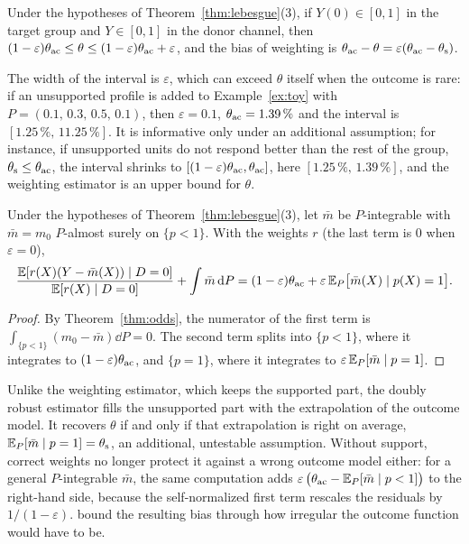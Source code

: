\begin{corollary}\label{cor:bounds}
Under the hypotheses of Theorem~\ref{thm:lebesgue}(3), if $Y(0)\in[0,1]$ in the target group and $Y\in[0,1]$ in the donor channel, then $(1-\varepsilon)\theta_{\mathrm{ac}}\le\theta\le(1-\varepsilon)\theta_{\mathrm{ac}}+\varepsilon$, and the bias of weighting is $\theta_{\mathrm{ac}}-\theta=\varepsilon(\theta_{\mathrm{ac}}-\theta_{\mathrm{s}})$.
\end{corollary}
The width of the interval is $\varepsilon$, which can exceed $\theta$ itself when the outcome is rare: if an unsupported profile is added to Example~\ref{ex:toy} with $P=(0.1,\,0.3,\,0.5,\,0.1)$, then $\varepsilon=0.1$, $\theta_{\mathrm{ac}}=1.39\,\%$ and the interval is $[1.25\,\%,\,11.25\,\%]$. It is informative only under an additional assumption; for instance, if unsupported units do not respond better than the rest of the group, $\theta_{\mathrm{s}}\le\theta_{\mathrm{ac}}$, the interval shrinks to $[(1-\varepsilon)\theta_{\mathrm{ac}},\theta_{\mathrm{ac}}]$, here $[1.25\,\%,\,1.39\,\%]$, and the weighting estimator is an upper bound for $\theta$.

\begin{corollary}\label{cor:drnosupport}
Under the hypotheses of Theorem~\ref{thm:lebesgue}(3), let $\bar m$ be $P$-integrable with $\bar m=m_0$ $P$-almost surely on $\{p<1\}$. With the weights $r$ (the last term is $0$ when $\varepsilon=0$),
\[
\frac{\mathbb{E}[r(X)(Y-\bar m(X))\mid D=0]}{\mathbb{E}[r(X)\mid D=0]}+\int\bar m\,\mathrm{d} P=(1-\varepsilon)\theta_{\mathrm{ac}}+\varepsilon\,\mathbb{E}_P\bigl[\bar m(X)\mid p(X)=1\bigr].
\]
\end{corollary}
\begin{proof}
By Theorem~\ref{thm:odds}, the numerator of the first term is $\int_{\{p<1\}}(m_0-\bar m)\dd P=0$. The second term splits into $\{p<1\}$, where it integrates to $(1-\varepsilon)\theta_{\mathrm{ac}}$, and $\{p=1\}$, where it integrates to $\varepsilon\,\mathbb{E}_P[\bar m\mid p=1]$.
\end{proof}

Unlike the weighting estimator, which keeps the supported part, the doubly robust estimator fills the unsupported part with the extrapolation of the outcome model. It recovers $\theta$ if and only if that extrapolation is right on average, $\mathbb{E}_P[\bar m\mid p=1]=\theta_{\mathrm{s}}$, an additional, untestable assumption. Without support, correct weights no longer protect it against a wrong outcome model either: for a general $P$-integrable $\bar m$, the same computation adds $\varepsilon\,\bigl(\theta_{\mathrm{ac}}-\mathbb{E}_P[\bar m\mid p<1]\bigr)$ to the right-hand side, because the self-normalized first term rescales the residuals by $1/(1-\varepsilon)$. \citet{manamkoong2025} bound the resulting bias through how irregular the outcome function would have to be.

